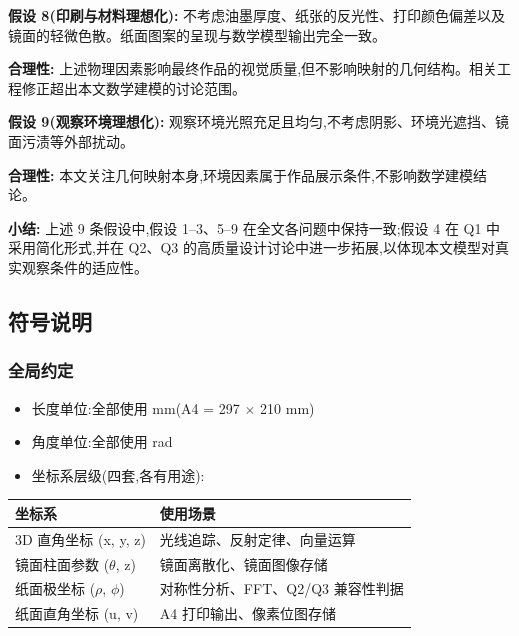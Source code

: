\documentclass[12pt, a4paper]{ctexart}
\begin{document}
\textbf{假设 8(印刷与材料理想化):} 不考虑油墨厚度、纸张的反光性、打印颜色偏差以及镜面的轻微色散。纸面图案的呈现与数学模型输出完全一致。

\textbf{合理性:} 上述物理因素影响最终作品的视觉质量,但不影响映射的几何结构。相关工程修正超出本文数学建模的讨论范围。

\textbf{假设 9(观察环境理想化):} 观察环境光照充足且均匀,不考虑阴影、环境光遮挡、镜面污渍等外部扰动。

\textbf{合理性:} 本文关注几何映射本身,环境因素属于作品展示条件,不影响数学建模结论。

\textbf{小结:} 上述 9 条假设中,假设 1–3、5–9 在全文各问题中保持一致;假设 4 在 Q1 中采用简化形式,并在 Q2、Q3 的高质量设计讨论中进一步拓展,以体现本文模型对真实观察条件的适应性。

\subsection{符号说明}

\subsubsection*{全局约定}
\begin{itemize}
    \item 长度单位:全部使用 mm(A4 = 297 $\times$ 210 mm)
    \item 角度单位:全部使用 rad
    \item 坐标系层级(四套,各有用途):
\end{itemize}

\begin{table}[H]
\centering
\begin{tabular}{ll}
\toprule
\textbf{坐标系} & \textbf{使用场景} \\
\midrule
3D 直角坐标 (x, y, z) & 光线追踪、反射定律、向量运算 \\
镜面柱面参数 ($\theta$, z) & 镜面离散化、镜面图像存储 \\
纸面极坐标 ($\rho$, $\phi$) & 对称性分析、FFT、Q2/Q3 兼容性判据 \\
纸面直角坐标 (u, v) & A4 打印输出、像素位图存储 \\
\bottomrule
\end{tabular}
\end{table}
\end{document}

